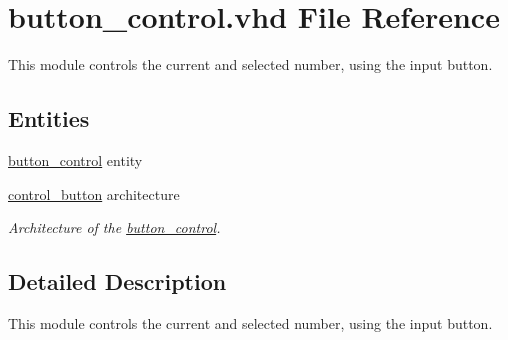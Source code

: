 \hypertarget{button__control_8vhd}{\section{button\-\_\-control.\-vhd File Reference}
\label{button__control_8vhd}
}


This module controls the current and selected number, using the input button.  


\subsection*{Entities}
\begin{DoxyCompactItemize}
\item 
\hyperlink{classbutton__control}{button\-\_\-control} entity
\item 
\hyperlink{classbutton__control_1_1control__button}{control\-\_\-button} architecture
\begin{DoxyCompactList}\small\item\em Architecture of the \hyperlink{classbutton__control}{button\-\_\-control}. \end{DoxyCompactList}\end{DoxyCompactItemize}


\subsection{Detailed Description}
This module controls the current and selected number, using the input button. 